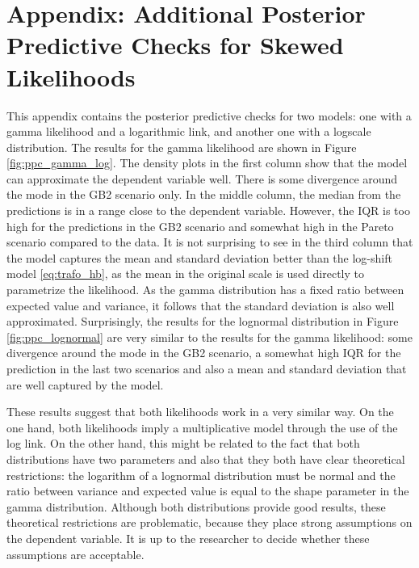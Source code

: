 \chapter{Appendix: Additional Posterior Predictive Checks for Skewed Likelihoods}
\label{appendix:ppc_skewed}

This appendix contains the posterior predictive checks for two models: one with a gamma likelihood and a logarithmic link, and another one with a logscale distribution.
The results for the gamma likelihood are shown in Figure \ref{fig:ppc_gamma_log}.
The density plots in the first column show that the model can approximate the dependent variable well.
There is some divergence around the mode in the GB2 scenario only.
In the middle column, the median from the predictions is in a range close to the dependent variable.
However, the IQR is too high for the predictions in the GB2 scenario and somewhat high in the Pareto scenario compared to the data.
It is not surprising to see in the third column that the model captures the mean and standard deviation better than the log-shift model \ref{eq:trafo_hb}, as the mean in the original scale is used directly to parametrize the likelihood.
As the gamma distribution has a fixed ratio between expected value and variance, it follows that the standard deviation is also well approximated.
Surprisingly, the results for the lognormal distribution in Figure \ref{fig:ppc_lognormal} are very similar to the results for the gamma likelihood: some divergence around the mode in the GB2 scenario, a somewhat high IQR for the prediction in the last two scenarios and also a mean and standard deviation that are well captured by the model.

These results suggest that both likelihoods work in a very similar way.
On the one hand, both likelihoods imply a multiplicative model through the use of the log link.
On the other hand, this might be related to the fact that both distributions have two parameters and also that they both have clear theoretical restrictions: the logarithm of a lognormal distribution must be normal and the ratio between variance and expected value is equal to the shape parameter in the gamma distribution.
Although both distributions provide good results, these theoretical restrictions are problematic, because they place strong assumptions on the dependent variable.
It is up to the researcher to decide whether these assumptions are acceptable.


